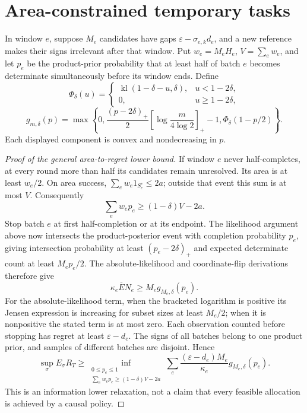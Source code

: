 \section{Area-constrained temporary tasks}
\label{app:area_lower}

In window $e$, suppose $M_e$ candidates have gaps
$\varepsilon-\sigma_{e,k}d_e$, and a new reference makes their signs
irrelevant after that window. Put $w_e=M_eH_e$, $V=\sum_ew_e$, and let
$p_e$ be the product-prior probability that at least half of batch $e$ becomes
determinate simultaneously before its window ends. Define
\[
 \Phi_\delta(u)=
 \begin{cases}
  \operatorname{kl}(1-\delta-u,\delta),&u<1-2\delta,\\
  0,&u\ge1-2\delta,
 \end{cases}
\]
\[
 g_{m,\delta}(p)=\max\left\{0,
 \frac{(p-2\delta)_+}{2}
       \left[\log\frac m{4\log2}\right]_+-1,
 \Phi_\delta(1-p/2)\right\}.
\]
Each displayed component is convex and nondecreasing in $p$.

\begin{proof}[Proof of the general area-to-regret lower bound]
If window $e$ never half-completes, at every round more than half its
candidates remain unresolved. Its area is at least $w_e/2$. On area success,
$\sum_ew_e1_{S_e^c}\le2a$; outside that event this sum is at most $V$.
Consequently
\[
 \sum_ew_ep_e\ge(1-\delta)V-2a.
\]
Stop batch $e$ at first half-completion or at its endpoint. The likelihood
argument above now intersects the product-posterior event with completion
probability $p_e$, giving intersection probability at least
$(p_e-2\delta)_+$ and expected determinate count at least $M_ep_e/2$.
The absolute-likelihood and coordinate-flip derivations therefore give
\[
 \kappa_e\overline EN_e\ge M_eg_{M_e,\delta}(p_e).
\]
For the absolute-likelihood term, when the bracketed logarithm is positive
its Jensen expression is increasing for subset sizes at least $M_e/2$;
when it is nonpositive the stated term is at most zero. Each observation
counted before stopping has regret at least $\varepsilon-d_e$.
The signs of all batches belong to one product prior, and samples of
different batches are disjoint. Hence
\begin{equation}
\label{eq:allocation_lower}
 \sup_\sigma E_\sigma R_T\ge
 \inf_{\substack{0\le p_e\le1\\
       \sum_ew_ep_e\ge(1-\delta)V-2a}}
 \sum_e\frac{(\varepsilon-d_e)M_e}{\kappa_e}
                  g_{M_e,\delta}(p_e).
\end{equation}
This is an information lower relaxation, not a claim that every feasible
allocation is achieved by a causal policy.
\end{proof}

